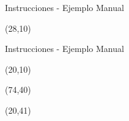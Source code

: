 \documentclass[aspectratio=169]{beamer}
\begin{document}
\begin{frame}[t,fragile]{Instrucciones - Ejemplo Manual}
    \begin{textblock}{25}(28,10)
    \end{textblock}
\end{frame}

\begin{frame}[t,fragile]{Instrucciones - Ejemplo Manual}
    \begin{textblock}{25}(20,10)
    \end{textblock}
    \begin{textblock}{50}(74,40)
    \end{textblock}
    \begin{textblock}{25}(20,41)
    \end{textblock}
\end{frame}
\end{document}

